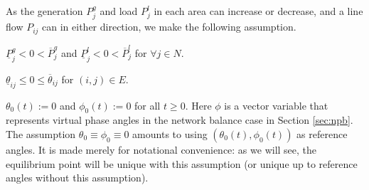 As the generation $P^g_j$ and load $P^l_j$ in each area can increase or decrease, 
and a line flow $P_{ij}$ can in either direction, we make the following assumption.
\bi
\item[\textbf{A1:}] 
\bee
\item $\underline{P}^g_j < 0 < \overline{P}^g_j$ and $\underline{P}^l_j <0 < \overline{P}^l_j$
for $\forall j\in N$.
\item $\underline{\theta}_{ij} \leq 0 \leq \overline{\theta}_{ij}$ for $(i,j)\in E$.
\item $\theta_0(t):=0$ and $\phi_0(t):=0$ for all $t\geq 0$.
\eee
\ei  
Here $\phi$ is a vector variable that represents virtual phase angles in the
network balance case in Section \ref{sec:npb}.
The assumption $\theta_0 \equiv \phi_0 \equiv 0$ amounts to using $(\theta_0(t), \phi_0(t))$ as reference
angles.  It is made merely for notational convenience: as we will see, the equilibrium point will be
unique with this assumption (or unique up to reference angles without this assumption).


